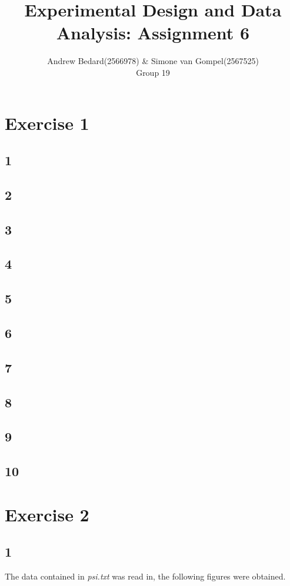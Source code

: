 \documentclass{article}
\title{Experimental Design and Data Analysis: Assignment 6}
\author{Andrew Bedard(2566978) \& Simone van Gompel(2567525) \\ Group 19}
\begin{document}
  \maketitle

  \section*{Exercise 1}
    \subsection*{1}
    \subsection*{2}
    \subsection*{3}
    \subsection*{4}
    \subsection*{5}
    \subsection*{6}
    \subsection*{7}
    \subsection*{8}
    \subsection*{9}
    \subsection*{10}
    
  \section*{Exercise 2}
    \subsection*{1}
    The data contained in \textit{psi.txt} was read in, the following figures were obtained.
\end{document}

